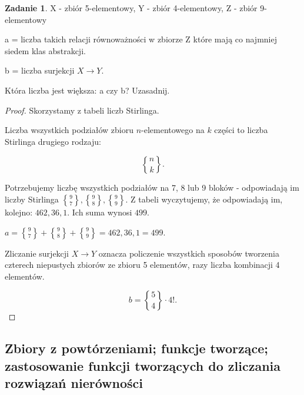 \documentclass[11pt]{article}
\theoremstyle{definition}
\newtheorem{zadanie}{Zadanie}
\numberwithin{zadanie}{subsection}
\DeclareRobustCommand{\stirling}{\genfrac\{\}{0pt}{}}
\begin{document}
\begin{zadanie}
    X - zbiór 5-elementowy, Y - zbiór 4-elementowy, Z - zbiór 9-elementowy

    a = liczba takich relacji równoważności w  zbiorze Z które mają co najmniej siedem klas abstrakcji.

    b = liczba surjekcji $X\to Y$.

    Która liczba jest większa: a czy b? Uzasadnij.
\end{zadanie}
\begin{proof}
    Skorzystamy z tabeli liczb Stirlinga.

    Liczba wszystkich podziałów zbioru $n$-elementowego na $k$ części to liczba Stirlinga drugiego rodzaju:

    $$\stirling nk.$$

    Potrzebujemy liczbę wszystkich podziałów na 7, 8 lub 9 bloków - odpowiadają im liczby Stirlinga $\stirling97,\stirling98,\stirling99$. Z tabeli wyczytujemy, że odpowiadają im, kolejno: $462, 36, 1$. Ich suma wynosi $499$.

    $a = \stirling97 + \stirling98 + \stirling99 = 462, 36, 1 = 499.$

    Zliczanie surjekcji $X\to Y$ oznacza policzenie wszystkich sposobów tworzenia czterech niepustych zbiorów ze zbioru 5 elementów, razy liczba kombinacji 4 elementów.

    $$b = \stirling54\cdot4!.$$

\end{proof}

\subsection{Zbiory z powtórzeniami; funkcje tworzące; zastosowanie funkcji tworzących do zliczania rozwiązań nierówności}
\end{document}
